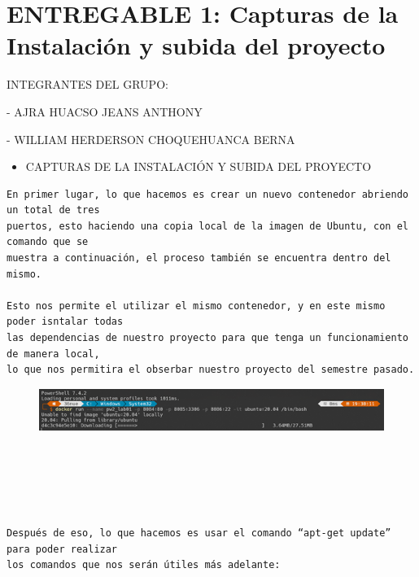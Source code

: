 \documentclass{article}
\begin{document}
	\section{ENTREGABLE 1: Capturas de la Instalación y subida del proyecto}
\item INTEGRANTES DEL GRUPO:
\item - AJRA HUACSO JEANS ANTHONY
\item - WILLIAM HERDERSON CHOQUEHUANCA BERNA
        
	\begin{itemize}		
    \item 
    CAPTURAS DE LA INSTALACIÓN Y SUBIDA DEL PROYECTO
    \end{itemize}
        
\begin{flushleft}
\begin{verbatim}
En primer lugar, lo que hacemos es crear un nuevo contenedor abriendo un total de tres 
puertos, esto haciendo una copia local de la imagen de Ubuntu, con el comando que se
muestra a continuación, el proceso también se encuentra dentro del mismo.

Esto nos permite el utilizar el mismo contenedor, y en este mismo poder isntalar todas
las dependencias de nuestro proyecto para que tenga un funcionamiento de manera local, 
lo que nos permitira el obserbar nuestro proyecto del semestre pasado.

\end{verbatim}
\end{flushleft}

\begin{figure}[h]
    \centering
    \includegraphics[width=1\textwidth]{img/1.png}
    \label{fig:imagen}
\end{figure}

\begin{flushleft}
\begin{verbatim}





Después de eso, lo que hacemos es usar el comando “apt-get update” para poder realizar
los comandos que nos serán útiles más adelante:
\end{verbatim}
\end{flushleft}
\end{document}
